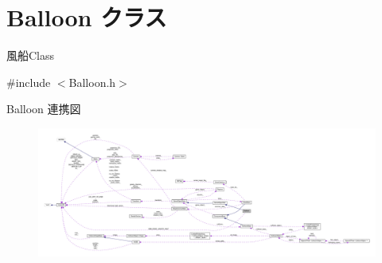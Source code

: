 \hypertarget{class_balloon}{}\section{Balloon クラス}
\label{class_balloon}


風船\+Class  




{\ttfamily \#include $<$Balloon.\+h$>$}



Balloon 連携図\nopagebreak
\begin{figure}[H]
\begin{center}
\leavevmode
\includegraphics[width=350pt]{class_balloon__coll__graph}
\end{center}
\end{figure}
